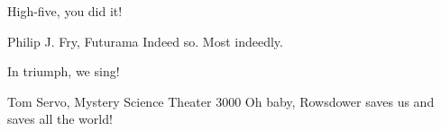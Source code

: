 \begin{conclude}
  \vspace{6mm}
  
  High-five, you did it!
  
  \vspace{6mm}

  \begin{wbepi}{Philip J. Fry, Futurama}
   Indeed so. Most indeedly.
  \end{wbepi}  
  
  \vspace{6mm}
  
  In triumph, we sing!
  
  \vspace{6mm}  
  
  \begin{wbepi}{Tom Servo, Mystery Science Theater 3000}
   Oh baby, Rowsdower saves us and saves all the world!
  \end{wbepi}  
  
\end{conclude}
